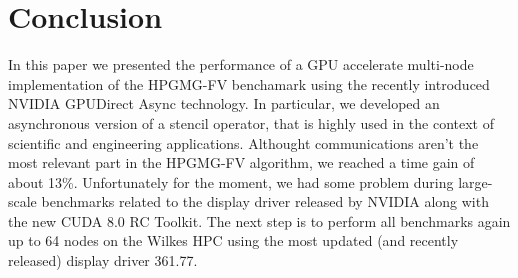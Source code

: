 \documentclass[conference]{IEEEtran}
\begin{document}
%




\section{Conclusion}

In this paper we presented the performance of a GPU accelerate multi-node
implementation of the HPGMG-FV benchamark using the recently introduced
NVIDIA GPUDirect Async technology.
% 
In particular, we developed an asynchronous version of a stencil
operator, that is highly used in the context of scientific and engineering
applications.  Althought communications aren't the most relevant part in
the HPGMG-FV algorithm, we reached a time gain of about 13\%.
%
Unfortunately for the moment, we had some problem during large-scale benchmarks related to the display driver released by NVIDIA along with the new CUDA 8.0 RC Toolkit.
The next step is to perform all benchmarks again up to 64 nodes on the Wilkes HPC using the most updated (and recently released) display driver 361.77.
\end{document}

